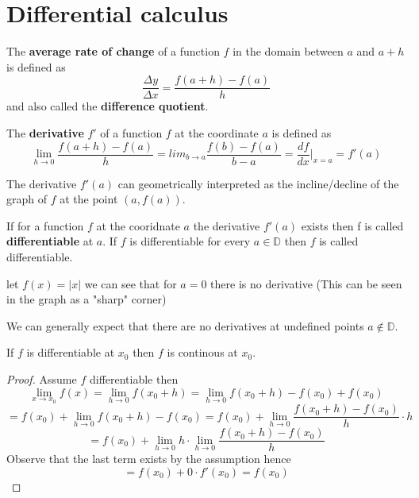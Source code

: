 \section{Differential calculus}

\begin{definition}
    The \textbf{average rate of change} of a function $f$ in the domain between $a$ and $a + h$ is defined as
    $$ \frac{\Delta y}{\Delta x} = \frac{f(a+h)-f(a)}{h}$$
    and also called the \textbf{difference quotient}.
\end{definition}

\begin{definition}
    The \textbf{derivative} $f'$ of a function $f$ at the coordinate $a$ is defined as
    $$\lim_{h \to 0}\frac{f(a+h)-f(a)}{h} = lim_{b \to a}\frac{f(b)-f(a)}{b-a} = \frac{df}{dx}\vert_{x=a} = f'(a)$$
\end{definition}

\begin{remark}
    The derivative $f'(a)$ can geometrically interpreted as the incline/decline of the graph of $f$ at the point $(a, f(a))$.
\end{remark}

\begin{definition}
    If for a function $f$ at the cooridnate $a$ the derivative $f'(a)$ exists then f is called \textbf{differentiable} at $a$. If $f$ is differentiable for every $a \in \mathbb{D}$ then $f$ is called differentiable.
\end{definition}

\begin{example}
    let $f(x) = |x|$ we can see that for $a=0$ there is no derivative (This can be seen in the graph as a "sharp" corner)
\end{example}

\begin{remark}
    We can generally expect that there are no derivatives at undefined points $a \notin \mathbb{D}$.
\end{remark}

\begin{lemma}
    If $f$ is differentiable at $x_0$ then $f$ is continous at $x_0$.
\end{lemma}

\begin{proof}
    Assume $f$ differentiable then
    $$\lim_{x \to x_0}f(x) = \lim_{h \to 0} f(x_0+h) = \lim_{h \to 0} f(x_0 + h) - f(x_0) + f(x_0)$$
    $$ = f(x_0) + \lim_{h \to 0} f(x_0+h)-f(x_0) = f(x_0) + \lim_{h \to 0} \frac{f(x_0+h)-f(x_0)}{h} \cdot h$$
    $$ = f(x_0) + \lim_{h \to 0} h \cdot \lim_{h \to 0} \frac{f(x_0+h)-f(x_0)}{h}$$
    Observe that the last term exists by the assumption hence
    $$ = f(x_0) + 0 \cdot f'(x_0) = f(x_0)$$
\end{proof}

